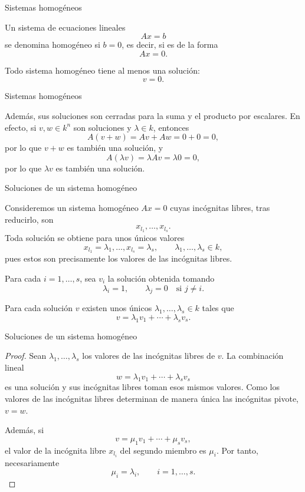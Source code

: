 \begin{frame}{Sistemas homogéneos}

\begin{definition}
Un sistema de ecuaciones lineales
\[
Ax=b
\]
se denomina \alert{homogéneo} si \(b=0\), es decir, si es de la forma
\[
Ax=0.
\]
\end{definition}

Todo sistema homogéneo tiene al menos una solución:
\[
v=0.
\]

\end{frame}

\begin{frame}{Sistemas homogéneos}

Además, sus soluciones son cerradas para la suma y el producto por
escalares. En efecto, si \(v,w\in k^n\) son soluciones y
\(\lambda\in k\), entonces
\[
A(v+w)=Av+Aw=0+0=0,
\]
por lo que \(v+w\) es también una solución, y
\[
A(\lambda v)=\lambda Av=\lambda0=0,
\]
por lo que \(\lambda v\) es también una solución.

\end{frame}

\begin{frame}{Soluciones de un sistema homogéneo}

Consideremos un sistema homogéneo \(Ax=0\) cuyas incógnitas libres,
tras reducirlo, son
\[
x_{l_1},\ldots,x_{l_s}.
\]
Toda solución se obtiene para unos \alert{únicos} valores
\[
x_{l_1}=\lambda_1,\ldots,x_{l_s}=\lambda_s,
\qquad
\lambda_1,\ldots,\lambda_s\in k,
\]
pues estos son precisamente los valores de las incógnitas libres.

Para cada \(i=1,\ldots,s\), sea \(v_i\) la solución obtenida tomando
\[
\lambda_i=1,
\qquad
\lambda_j=0\quad\text{si }j\neq i.
\]

\begin{proposition}
Para cada solución \(v\) existen unos únicos
\(\lambda_1,\ldots,\lambda_s\in k\) tales que
\[
v=\lambda_1v_1+\cdots+\lambda_sv_s.
\]
\end{proposition}

\end{frame}

\begin{frame}{Soluciones de un sistema homogéneo}

\begin{proof}
Sean \(\lambda_1,\ldots,\lambda_s\) los valores de las incógnitas
libres de \(v\). La combinación lineal
\[
w=\lambda_1v_1+\cdots+\lambda_sv_s
\]
es una solución y sus incógnitas libres toman esos mismos valores.
Como los valores de las incógnitas libres determinan de manera única
las incógnitas pivote, \(v=w\).

Además, si
\[
v=\mu_1v_1+\cdots+\mu_sv_s,
\]
el valor de la incógnita libre \(x_{l_i}\) del segundo miembro es
\(\mu_i\). Por tanto, necesariamente
\[
\mu_i=\lambda_i,\qquad i=1,\ldots,s.
\]
\end{proof}

\end{frame}

